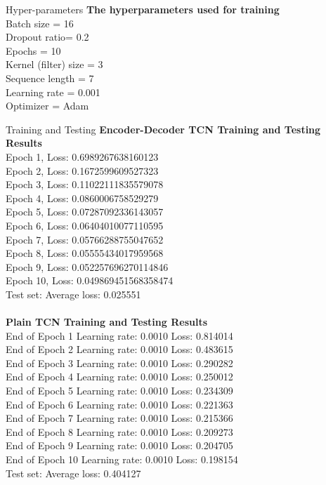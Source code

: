 \documentclass[8pt,xcolor=dvipsnames,compress]{beamer}
\begin{document}
\begin{frame}[fragile]{Hyper-parameters}
\footnotesize
\textbf{The hyperparameters used for training}\\
Batch size = 16 \\
Dropout ratio= 0.2 \\
Epochs = 10 \\
Kernel (filter) size = 3 \\
Sequence length = 7 \\
Learning rate = 0.001 \\
Optimizer = Adam \\

\end{frame}

\begin{frame}[fragile]{Training and Testing}
\footnotesize
\textbf{Encoder-Decoder TCN Training and Testing Results}\\
Epoch 1, Loss: 0.6989267638160123\\
Epoch 2, Loss: 0.1672599609527323\\
Epoch 3, Loss: 0.11022111835579078\\
Epoch 4, Loss: 0.0860006758529279\\
Epoch 5, Loss: 0.07287092336143057\\
Epoch 6, Loss: 0.06404010077110595\\
Epoch 7, Loss: 0.05766288755047652\\
Epoch 8, Loss: 0.05555434017959568\\
Epoch 9, Loss: 0.052257696270114846\\
Epoch 10, Loss: 0.049869451568358474\\
Test set: Average loss: 0.025551\\
\\
\textbf{Plain TCN Training and Testing Results}\\
End of Epoch  1         Learning rate: 0.0010   Loss: 0.814014\\
End of Epoch  2         Learning rate: 0.0010   Loss: 0.483615\\
End of Epoch  3         Learning rate: 0.0010   Loss: 0.290282\\
End of Epoch  4         Learning rate: 0.0010   Loss: 0.250012\\
End of Epoch  5         Learning rate: 0.0010   Loss: 0.234309\\
End of Epoch  6         Learning rate: 0.0010   Loss: 0.221363\\
End of Epoch  7         Learning rate: 0.0010   Loss: 0.215366\\
End of Epoch  8         Learning rate: 0.0010   Loss: 0.209273\\
End of Epoch  9         Learning rate: 0.0010   Loss: 0.204705\\
End of Epoch 10         Learning rate: 0.0010   Loss: 0.198154\\
Test set: Average loss: 0.404127
\end{frame}
\end{document}
